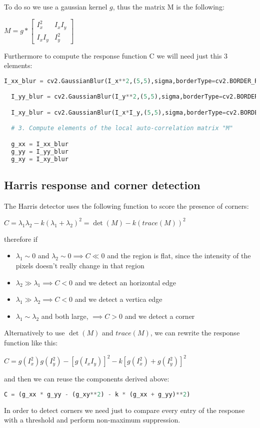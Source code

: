\documentclass{ETHExercise}
\begin{document}
To do so we use a gaussian kernel $g$, thus the matrix M is 
the following:
\begin{center}
  $M = g * \begin{bmatrix}
    I_x^2 & I_xI_y\\
    I_xI_y & I_y^2
  \end{bmatrix}$
\end{center}

Furthermore to compute the response function C we will need just this 3 elements:
\begin{lstlisting}[language=Python, caption=Local auto-correlation matrix elements]
  I_xx_blur = cv2.GaussianBlur(I_x**2,(5,5),sigma,borderType=cv2.BORDER_REPLICATE)

  I_yy_blur = cv2.GaussianBlur(I_y**2,(5,5),sigma,borderType=cv2.BORDER_REPLICATE)

  I_xy_blur = cv2.GaussianBlur(I_x*I_y,(5,5),sigma,borderType=cv2.BORDER_REPLICATE)

  # 3. Compute elements of the local auto-correlation matrix "M"

  g_xx = I_xx_blur
  g_yy = I_yy_blur
  g_xy = I_xy_blur
\end{lstlisting}

\subsection{Harris response and corner detection}
The Harris detector uses the following function to score
the presence of corners:
\begin{center}
  $C = \lambda_1 \lambda_2 - k (\lambda_1 + \lambda_2)^2 = \det(M) - k (trace(M))^2$
\end{center}
therefore if
\begin{itemize}
  \item $\lambda_1 \sim 0$ and $\lambda_2 \sim 0 \implies C \ll 0$ and the region is flat,
   since the intensity of the pixels doesn't really change in that region
  \item $\lambda_2 \gg \lambda_1 \implies C < 0$ and we detect an horizontal edge
  \item $\lambda_1 \gg \lambda_2 \implies C < 0$ and we detect a vertica edge
  \item $\lambda_1 \sim \lambda_2$ and both large, $\implies C > 0$ and we detect a corner
\end{itemize}
Alternatively to use $\det(M)$ and $trace(M)$, we can rewrite the response function like this:
\begin{center}
  $C = g(I_x^2)g(I_y^2)- [g(I_x I_y)]^2 - k[ g(I_x^2)+g(I_y^2)]^2$
\end{center}
and then we can reuse the components derived above:
\begin{lstlisting}[language=Python, caption=Harris response function]
  C = (g_xx * g_yy - (g_xy**2) - k * (g_xx + g_yy)**2)
\end{lstlisting}

In order to detect corners we need just to compare every entry of
the response with a threshold and perform non-maximum suppression.
\end{document}
